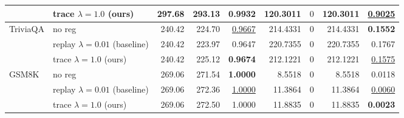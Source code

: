 \begin{table}[t]
{\begin{tabular}{l l rrrrrrr}
 & trace $\lambda{=}1.0$ (ours) & 297.68 & 293.13 & \textbf{0.9932} & 120.3011 & \cellcolor{cyan!12} $0$ & 120.3011 & \underline{0.9025} \\
\midrule
TriviaQA & no reg & 240.42 & 224.70 & \underline{0.9667} & 214.4331 & \cellcolor{cyan!12} $0$ & 214.4331 & \textbf{0.1552} \\
 & replay $\lambda{=}0.01$ (baseline) & 240.42 & 223.97 & 0.9647 & 220.7355 & \cellcolor{cyan!12} $0$ & 220.7355 & 0.1767 \\
 & trace $\lambda{=}1.0$ (ours) & 240.42 & 225.12 & \textbf{0.9674} & 212.1221 & \cellcolor{cyan!12} $0$ & 212.1221 & \underline{0.1575} \\
\midrule
GSM8K & no reg & 269.06 & 271.54 & \textbf{1.0000} & 8.5518 & \cellcolor{cyan!12} $0$ & 8.5518 & 0.0118 \\
 & replay $\lambda{=}0.01$ (baseline) & 269.06 & 272.36 & \underline{1.0000} & 11.3864 & \cellcolor{cyan!12} $0$ & 11.3864 & \underline{0.0060} \\
 & trace $\lambda{=}1.0$ (ours) & 269.06 & 272.50 & 1.0000 & 11.8835 & \cellcolor{cyan!12} $0$ & 11.8835 & \textbf{0.0023} \\
\bottomrule
\end{tabular}}
\end{table}